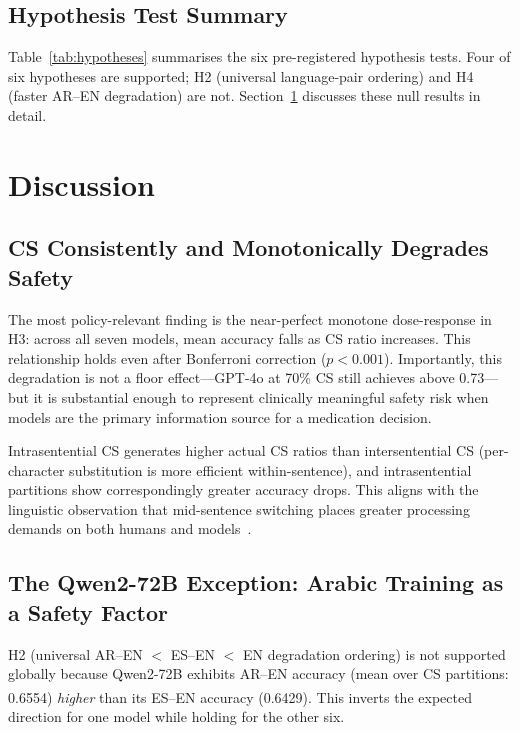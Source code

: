\documentclass[3p,times,procedia]{elsarticle}
\newcommand{\simflag}{\textsuperscript{\textdagger}}
\begin{document}
\subsection{Hypothesis Test Summary}

Table~\ref{tab:hypotheses} summarises the six pre-registered hypothesis
tests.
Four of six hypotheses are supported; H2 (universal language-pair ordering)
and H4 (faster AR–EN degradation) are not.
Section~\ref{sec:discussion} discusses these null results in detail.



\section{Discussion}
\label{sec:discussion}

\subsection{CS Consistently and Monotonically Degrades Safety}

The most policy-relevant finding is the near-perfect monotone dose-response
in H3: across all seven models, mean accuracy falls as CS ratio increases.
This relationship holds even after Bonferroni correction ($p < 0.001$).
Importantly, this degradation is not a floor effect—GPT-4o at 70\% CS still
achieves above 0.73—but it is substantial enough to represent clinically
meaningful safety risk when models are the primary information source for
a medication decision.

Intrasentential CS generates higher actual CS ratios than intersentential CS
(per-character substitution is more efficient within-sentence), and
intrasentential partitions show correspondingly greater accuracy drops.
This aligns with the linguistic observation that mid-sentence switching places
greater processing demands on both humans and models~\cite{Poplack1980}.

\subsection{The Qwen2-72B Exception: Arabic Training as a Safety Factor}

H2 (universal AR–EN $<$ ES–EN $<$ EN degradation ordering) is not
supported globally because Qwen2-72B exhibits AR–EN accuracy
(mean over CS partitions: 0.6554) \emph{higher} than its ES–EN accuracy
(0.6429)\simflag.
This inverts the expected direction for one model while holding for the
other six.
\end{document}
